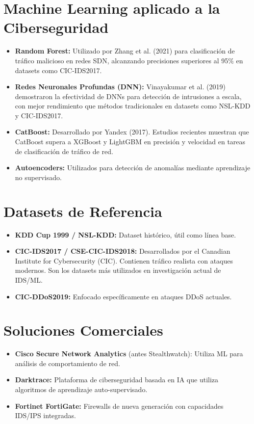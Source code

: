 \documentclass[12pt,letterpaper]{report}
\begin{document}
\section{Machine Learning aplicado a la Ciberseguridad}

\begin{itemize}
  \item \textbf{Random Forest:} Utilizado por Zhang et al. (2021) para clasificación de tráfico malicioso en redes SDN, alcanzando precisiones superiores al 95\% en datasets como CIC-IDS2017.
  
  \item \textbf{Redes Neuronales Profundas (DNN):} Vinayakumar et al. (2019) demostraron la efectividad de DNNs para detección de intrusiones a escala, con mejor rendimiento que métodos tradicionales en datasets como NSL-KDD y CIC-IDS2017.
  
  \item \textbf{CatBoost:} Desarrollado por Yandex (2017). Estudios recientes muestran que CatBoost supera a XGBoost y LightGBM en precisión y velocidad en tareas de clasificación de tráfico de red.
  
  \item \textbf{Autoencoders:} Utilizados para detección de anomalías mediante aprendizaje no supervisado.
\end{itemize}

\section{Datasets de Referencia}

\begin{itemize}
  \item \textbf{KDD Cup 1999 / NSL-KDD:} Dataset histórico, útil como línea base.
  \item \textbf{CIC-IDS2017 / CSE-CIC-IDS2018:} Desarrollados por el Canadian Institute for Cybersecurity (CIC). Contienen tráfico realista con ataques modernos. Son los datasets más utilizados en investigación actual de IDS/ML.
  \item \textbf{CIC-DDoS2019:} Enfocado específicamente en ataques DDoS actuales.
\end{itemize}

\section{Soluciones Comerciales}

\begin{itemize}
  \item \textbf{Cisco Secure Network Analytics} (antes Stealthwatch): Utiliza ML para análisis de comportamiento de red.
  \item \textbf{Darktrace:} Plataforma de ciberseguridad basada en IA que utiliza algoritmos de aprendizaje auto-supervisado.
  \item \textbf{Fortinet FortiGate:} Firewalls de nueva generación con capacidades IDS/IPS integradas.
\end{itemize}
\end{document}
